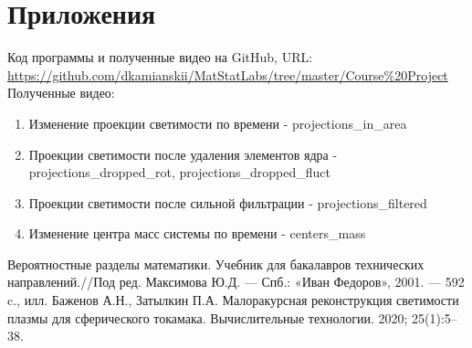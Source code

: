 \documentclass[a4paper,12pt]{article} %
\begin{document}
	\section{Приложения}
	Код программы и полученные видео на GitHub, URL:
	\url{https://github.com/dkamianskii/MatStatLabs/tree/master/Course%20Project}
	\newline Полученные видео:
	\begin{enumerate}
		\item Изменение проекции светимости по времени - projections\_in\_area
		\item Проекции светимости после удаления элементов ядра - projections\_dropped\_rot, projections\_dropped\_fluct
		\item Проекции светимости после сильной фильтрации - projections\_filtered
		\item Изменение центра масс системы по времени - centers\_mass
	\end{enumerate}
	\begin{thebibliography}{99}
		   Вероятностные разделы математики. Учебник для бакалавров технических направлений.//Под ред. Максимова Ю.Д. — Спб.: «Иван Федоров», 2001. — 592 c., илл.
		 Баженов А.Н., Затылкин П.А. Малоракурсная реконструкция светимости плазмы для сферического токамака. Вычислительные технологии. 2020; 25(1):5–38.
	\end{thebibliography}
\end{document}
